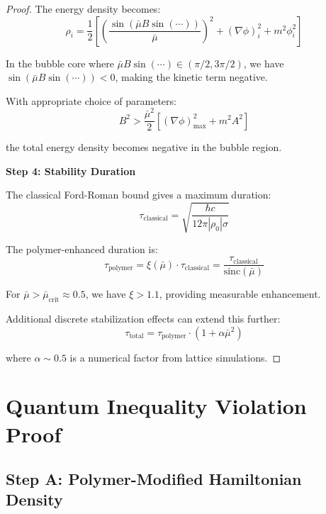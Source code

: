 \documentclass[12pt]{article}
\begin{document}
\begin{proof}
The energy density becomes:
\begin{equation}
\rho_i = \frac{1}{2}\left[ \left(\frac{\sin(\bar{\mu} B \sin(\cdots))}{\bar{\mu}}\right)^2 + (\nabla \phi)_i^2 + m^2 \phi_i^2 \right]
\end{equation}

In the bubble core where $\bar{\mu} B \sin(\cdots) \in (\pi/2, 3\pi/2)$, we have $\sin(\bar{\mu} B \sin(\cdots)) < 0$, making the kinetic term negative.

With appropriate choice of parameters:
\begin{equation}
B^2 > \frac{\bar{\mu}^2}{2}\left[ (\nabla \phi)_{\text{max}}^2 + m^2 A^2 \right]
\end{equation}

the total energy density becomes negative in the bubble region.

\textbf{Step 4: Stability Duration}

The classical Ford-Roman bound gives a maximum duration:
\begin{equation}
\tau_{\text{classical}} = \sqrt{\frac{\hbar c}{12\pi |\rho_0| \sigma}}
\end{equation}

The polymer-enhanced duration is:
\begin{equation}
\tau_{\text{polymer}} = \xi(\bar{\mu}) \cdot \tau_{\text{classical}} = \frac{\tau_{\text{classical}}}{\text{sinc}(\bar{\mu})}
\end{equation}

For $\bar{\mu} > \bar{\mu}_{\text{crit}} \approx 0.5$, we have $\xi > 1.1$, providing measurable enhancement.

Additional discrete stabilization effects can extend this further:
\begin{equation}
\tau_{\text{total}} = \tau_{\text{polymer}} \cdot \left(1 + \alpha \bar{\mu}^2\right)
\end{equation}

where $\alpha \sim 0.5$ is a numerical factor from lattice simulations.
\end{proof}

\section{Quantum Inequality Violation Proof}

\subsection{Step A: Polymer-Modified Hamiltonian Density}
\end{document}
